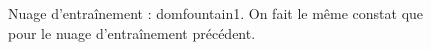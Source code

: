 \documentclass[a4paper, onecolumn, 11pt]{article}
\begin{document}
\begin{figure}[h]
    \qquad
    \caption{Nuage d'entraînement : domfountain1. On fait le même constat que pour le nuage d'entraînement précédent.}
    \label{fig:domfountain1}
\end{figure}
\end{document}

